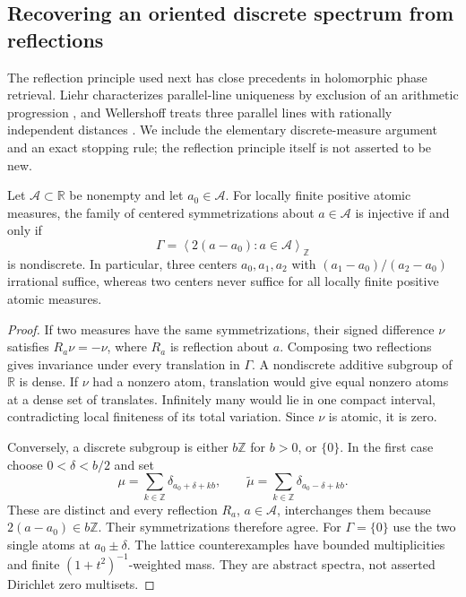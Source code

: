 \subsection{Recovering an oriented discrete spectrum from reflections}

The reflection principle used next has close precedents in holomorphic
phase retrieval. Liehr characterizes parallel-line uniqueness by exclusion
of an arithmetic progression \cite{Liehr2024}, and Wellershoff treats
three parallel lines with rationally independent distances
\cite{Wellershoff2024}. We include the elementary discrete-measure
argument and an exact stopping rule; the reflection principle itself is
not asserted to be new.

\begin{proposition}
\label{rw:prop:reflection}
Let $\mathcal A\subset\mathbb R$ be nonempty and let $a_0\in\mathcal A$.
For locally finite positive atomic measures, the family of centered
symmetrizations about $a\in\mathcal A$ is injective if and only if
\[
 \Gamma=\left\langle2(a-a_0):a\in\mathcal A\right\rangle_{\mathbb Z}
\]
is nondiscrete. In particular, three centers $a_0,a_1,a_2$ with
$(a_1-a_0)/(a_2-a_0)$ irrational suffice, whereas two centers never
suffice for all locally finite positive atomic measures.
\end{proposition}

\begin{proof}
If two measures have the same symmetrizations, their signed difference
$\nu$ satisfies $R_a\nu=-\nu$, where $R_a$ is reflection about $a$.
Composing two reflections gives invariance under every translation in
$\Gamma$. A nondiscrete additive subgroup of $\mathbb R$ is dense.
If $\nu$ had a nonzero atom, translation would give equal nonzero atoms
at a dense set of translates. Infinitely many would lie in one compact
interval, contradicting local finiteness of its total variation.
Since $\nu$ is atomic, it is zero.

Conversely, a discrete subgroup is either $b\mathbb Z$ for $b>0$, or
$\{0\}$. In the first case choose $0<\delta<b/2$ and set
\[
 \mu=\sum_{k\in\mathbb Z}\delta_{a_0+\delta+kb},\qquad
 \widetilde\mu=\sum_{k\in\mathbb Z}\delta_{a_0-\delta+kb}.
\]
These are distinct and every reflection $R_a$, $a\in\mathcal A$,
interchanges them because $2(a-a_0)\in b\mathbb Z$.
Their symmetrizations therefore agree. For $\Gamma=\{0\}$ use the
two single atoms at $a_0\pm\delta$. The lattice counterexamples have
bounded multiplicities and finite $(1+t^2)^{-1}$-weighted mass. They
are abstract spectra, not asserted Dirichlet zero multisets.
\end{proof}

